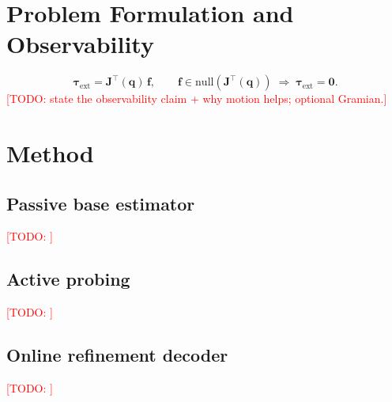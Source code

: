 \documentclass[conference]{IEEEtran}
\newcommand{\todo}[1]{\textcolor{red}{[TODO: #1]}}
\begin{document}
\section{Problem Formulation and Observability}
\begin{equation}
  \boldsymbol{\tau}_{\text{ext}} = \mathbf{J}^{\top}(\mathbf{q})\,\mathbf{f},
  \qquad
  \mathbf{f}\in\mathrm{null}\!\left(\mathbf{J}^{\top}(\mathbf{q})\right)
  \;\Rightarrow\; \boldsymbol{\tau}_{\text{ext}}=\mathbf{0}.
  \label{eq:jt}
\end{equation}
\todo{state the observability claim + why motion helps; optional Gramian.}

\section{Method}
\subsection{Passive base estimator}
\todo{}

\subsection{Active probing}
\todo{}

\subsection{Online refinement decoder}
\todo{}
\end{document}
